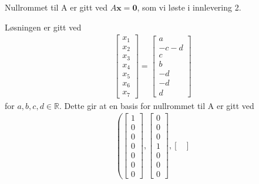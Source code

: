 \documentclass[11pt, a4paper, norsk]{NTNUoving}
\begin{document}
\begin{oppgave}
\begin{punkt}
        
        Nullrommet til A er gitt ved $A\textbf{x}=\textbf{0}$, som vi løste i innlevering 2.
        
        Løsningen er gitt ved 
                \begin{align*}
            \begin{bmatrix}
                x_1\\
                x_2\\
                x_3\\
                x_4\\
                x_5\\
                x_6\\
                x_7
            \end{bmatrix}=
            \begin{bmatrix}
                a\\
                -c-d\\
                c\\
                b\\
                -d\\
                -d\\
                d
            \end{bmatrix}
        \end{align*}
        for $a, b, c, d \in \mathbb{R}$. Dette gir at en basis for nullrommet til A er gitt ved
        \begin{align}
        \left(
            \begin{bmatrix}
                1\\
                0\\
                0\\
                0\\
                0\\
                0\\
                0
            \end{bmatrix},
            \begin{bmatrix}
                0\\
                0\\
                0\\
                1\\
                0\\
                0\\
                0
            \end{bmatrix},
            \begin{bmatrix}

\end{bmatrix}
\end{align}
\end{punkt}
\end{oppgave}
\end{document}
